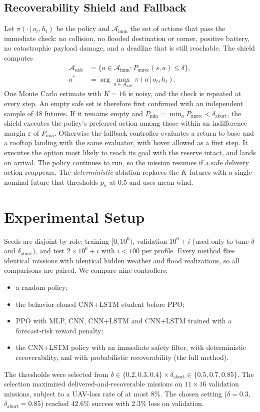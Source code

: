 \documentclass{ieeeaccess}
\newcommand{\Punrec}{P_{\mathrm{unrec}}}
\begin{document}
\subsection{Recoverability Shield and Fallback}
Let $\pi(\cdot\,|\,o_t,h_t)$ be the policy and $\mathcal{A}_{\mathrm{imm}}$ the set of actions that pass the immediate check: no collision, no flooded destination or corner, positive battery, no catastrophic payload damage, and a deadline that is still reachable. The shield computes
\begin{align}
\mathcal{A}_{\mathrm{safe}}&=\{a\in\mathcal{A}_{\mathrm{imm}}:\Punrec(s,a)\le\delta\},\label{eq:shield}\\
a^{*}&=\arg\max_{a\in\mathcal{A}_{\mathrm{safe}}}\pi(a\,|\,o_t,h_t).\label{eq:select}
\end{align}
One Monte Carlo estimate with $K=16$ is noisy, and the check is repeated at every step. An empty safe set is therefore first confirmed with an independent sample of 48 futures. If it remains empty and $P_{\min}=\min_a\Punrec<\delta_{\mathrm{abort}}$, the shield executes the policy's preferred action among those within an indifference margin $\varepsilon$ of $P_{\min}$. Otherwise the fallback controller evaluates a return to base and a rooftop landing with the same evaluator, with hover allowed as a first step. It executes the option most likely to reach its goal with the reserve intact, and lands on arrival. The policy continues to run, so the mission resumes if a safe delivery action reappears. The \emph{deterministic} ablation replaces the $K$ futures with a single nominal future that thresholds $\tilde p_h$ at 0.5 and uses mean wind.

\section{Experimental Setup}
\label{sec:setup}
Seeds are disjoint by role: training $[0,10^6)$, validation $10^6+i$ (used only to tune $\delta$ and $\delta_{\mathrm{abort}}$), and test $2\times10^6+i$ with $i<100$ per profile. Every method flies identical missions with identical hidden weather and flood realizations, so all comparisons are paired. We compare nine controllers:
\begin{itemize}
\item a random policy;
\item the behavior-cloned CNN+LSTM student before PPO;
\item PPO with MLP, CNN, CNN+LSTM and CNN+LSTM trained with a forecast-risk reward penalty;
\item the CNN+LSTM policy with an immediate safety filter, with deterministic recoverability, and with probabilistic recoverability (the full method).
\end{itemize}
The thresholds were selected from $\delta\in\{0.2,0.3,0.4\}\times\delta_{\mathrm{abort}}\in\{0.5,0.7,0.85\}$. The selection maximized delivered-and-recoverable missions on $11\times16$ validation missions, subject to a UAV-loss rate of at most 8\%. The chosen setting ($\delta=0.3$, $\delta_{\mathrm{abort}}=0.85$) reached 42.6\% success with 2.3\% loss on validation.
\end{document}

